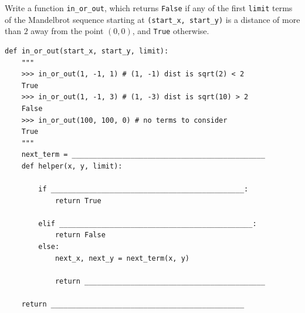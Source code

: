 \begin{blocksection}
\question Write a function \lstinline{in_or_out}, which returns \lstinline{False} if any of the first \lstinline{limit} terms of the Mandelbrot sequence starting at \lstinline{(start_x, start_y)} is a distance of more than $2$ away from the point $(0, 0)$, and \lstinline{True} otherwise. 
\begin{lstlisting}
def in_or_out(start_x, start_y, limit):
    """
    >>> in_or_out(1, -1, 1) # (1, -1) dist is sqrt(2) < 2
    True
    >>> in_or_out(1, -1, 3) # (1, -3) dist is sqrt(10) > 2
    False
    >>> in_or_out(100, 100, 0) # no terms to consider
    True
    """
    next_term = ______________________________________________
    def helper(x, y, limit):

        if ______________________________________________:
            return True

        elif ______________________________________________: 
            return False
        else: 
            next_x, next_y = next_term(x, y)

            return ___________________________________________
            
    return ______________________________________________
\end{lstlisting}
\end{blocksection}
